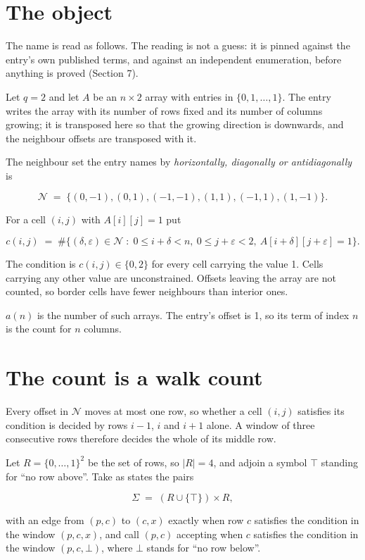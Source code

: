 \documentclass[11pt]{article}
\theoremstyle{definition}
\begin{document}
\section{The object}

The name is read as follows. The reading is not a guess: it is pinned against the entry's own published terms, and against an independent enumeration, before anything is proved (Section 7).

Let $q = 2$ and let $A$ be an $n \times 2$ array with entries in $\{0,1,\dots,1\}$. The entry writes the array with its number of rows fixed and its number of columns growing; it is transposed here so that the growing direction is downwards, and the neighbour offsets are transposed with it.

The neighbour set the entry names by {\itshape horizontally, diagonally or antidiagonally} is

\[\mathcal{N} \;=\; \{(0,-1), (0,1), (-1,-1), (1,1), (-1,1), (1,-1)\}.\]

For a cell $(i,j)$ with $A[i][j] = 1$ put

\[c(i,j) \;=\; \#\bigl\{(\delta,\varepsilon)\in\mathcal{N} \;:\; 0\le i+\delta<n,\ 0\le j+\varepsilon<2,\ A[i+\delta][j+\varepsilon] = 1\bigr\}.\]

The condition is $c(i,j) \in \{0, 2\}$ for every cell carrying the value 1. Cells carrying any other value are unconstrained. Offsets leaving the array are not counted, so border cells have fewer neighbours than interior ones.

$a(n)$ is the number of such arrays. The entry's offset is 1, so its term of index $n$ is the count for $n$ columns.

\section{The count is a walk count}

Every offset in $\mathcal{N}$ moves at most one row, so whether a cell $(i,j)$ satisfies its condition is decided by rows $i-1$, $i$ and $i+1$ alone. A window of three consecutive rows therefore decides the whole of its middle row.

Let $R = \{0,\dots,1\}^{2}$ be the set of rows, so $|R| = 4$, and adjoin a symbol $\top$ standing for ``no row above''. Take as states the pairs

\[\Sigma \;=\; (R \cup \{\top\}) \times R,\]

with an edge from $(p,c)$ to $(c,x)$ exactly when row $c$ satisfies the condition in the window $(p,c,x)$, and call $(p,c)$ accepting when $c$ satisfies the condition in the window $(p,c,\bot)$, where $\bot$ stands for ``no row below''.
\end{document}
